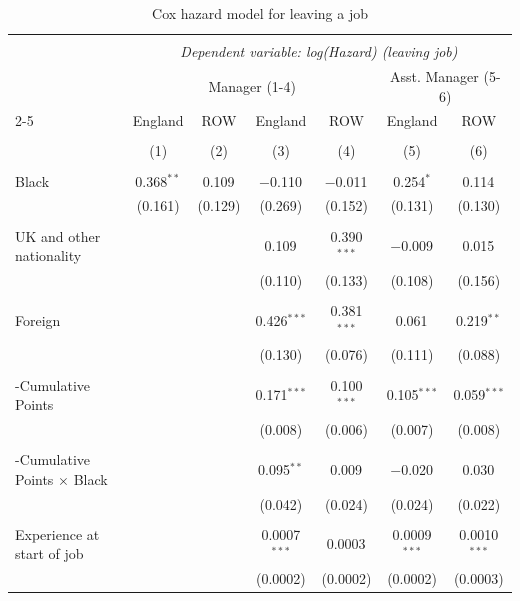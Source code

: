 \begin{table}[!htbp]
\centering
\caption{Cox hazard model for leaving a job}
\label{tab:hazard_final}
\footnotesize
\setlength\tabcolsep{3pt}
\begin{threeparttable}
\begin{tabular}{lcccccc}
\\[-1.8ex]\hline
\hline \\[-1.8ex]
 & \multicolumn{6}{c}{\textit{Dependent variable: log(Hazard) (leaving job)}} \\
& \multicolumn{4}{c}{Manager (1-4)} & \multicolumn{2}{c}{Asst. Manager (5-6)}\\
\cline{2-5} \cline{6-7}
& England & ROW & England & ROW & England & ROW\\
\\[-1.8ex] & (1) & (2) & (3) & (4) & (5) & (6)\\
\hline \\[-1.8ex]
Black & 0.368$^{**}$ & 0.109$^{}$ & $-$0.110$^{}$ & $-$0.011$^{}$ & 0.254$^{*}$ & 0.114$^{}$ \\ 
  & (0.161) & (0.129) & (0.269) & (0.152) & (0.131) & (0.130) \\ 
 & & & & & & \\ 
UK and other nationality &  &  & 0.109$^{}$ & 0.390$^{***}$ & $-$0.009$^{}$ & 0.015$^{}$ \\ 
  &  &  & (0.110) & (0.133) & (0.108) & (0.156) \\ 
 & & & & & & \\ 
Foreign &  &  & 0.426$^{***}$ & 0.381$^{***}$ & 0.061$^{}$ & 0.219$^{**}$ \\ 
  &  &  & (0.130) & (0.076) & (0.111) & (0.088) \\ 
 & & & & & & \\ 
-Cumulative Points &  &  & 0.171$^{***}$ & 0.100$^{***}$ & 0.105$^{***}$ & 0.059$^{***}$ \\ 
  &  &  & (0.008) & (0.006) & (0.007) & (0.008) \\ 
 & & & & & & \\ 
-Cumulative Points $\times$ Black &  &  & 0.095$^{**}$ & 0.009$^{}$ & $-$0.020$^{}$ & 0.030$^{}$ \\ 
  &  &  & (0.042) & (0.024) & (0.024) & (0.022) \\ 
 & & & & & & \\ 
Experience at start of job &  &  & 0.0007$^{***}$ & 0.0003$^{}$ & 0.0009$^{***}$ & 0.0010$^{***}$ \\ 
  &  &  & (0.0002) & (0.0002) & (0.0002) & (0.0003) \\ 

\end{tabular}
\end{threeparttable}
\end{table}
